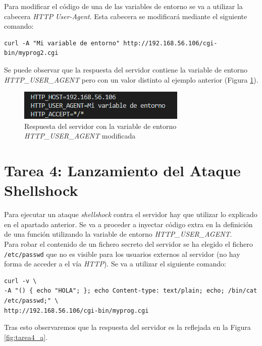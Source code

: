 \documentclass[10pt,a4paper]{article}
\begin{document}
Para modificar el código de una de las variables de entorno se va a utilizar la cabecera \emph{HTTP} \emph{User-Agent}. Esta cabecera se modificará mediante el siguiente comando:

\begin{lstlisting}
curl -A "Mi variable de entorno" http://192.168.56.106/cgi-bin/myprog2.cgi
\end{lstlisting}

Se puede observar que la respuesta del servidor contiene la variable de entorno \emph{HTTP\_{}USER\_{}AGENT} pero con un valor distinto al ejemplo anterior (Figura \ref{fig:tarea3_modificado}).

\begin{figure}[h!]
\centering
\includegraphics[scale=0.9]{images/Tarea_3_modificada.png}
\caption{Respuesta del servidor con la variable de entorno \emph{HTTP\_{}USER\_{}AGENT} modificada}
\label{fig:tarea3_modificado} 
\end{figure}

\section{Tarea 4: Lanzamiento del Ataque Shellshock}

Para ejecutar un ataque \emph{shellshock} contra el servidor hay que utilizar lo explicado en el apartado anterior. Se va a proceder a inyectar código extra en la definición de una función utilizando la variable de entorno \emph{HTTP\_{}USER\_{}AGENT}.\\

Para robar el contenido de un fichero secreto del servidor se ha elegido el fichero \texttt{/etc/passwd} que no es visible para los usuarios externos al servidor (no hay forma de acceder a el vía \emph{HTTP}). Se va a utilizar el siguiente comando:

\begin{lstlisting}
curl -v \
-A "() { echo "HOLA"; }; echo Content-type: text/plain; echo; /bin/cat /etc/passwd;" \
http://192.168.56.106/cgi-bin/myprog.cgi
\end{lstlisting}

Tras esto observaremos que la respuesta del servidor es la reflejada en la Figura \ref{fig:tarea4_a}.
\end{document}
